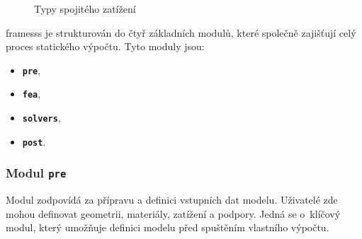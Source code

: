 \begin{figure}[H]
    
    \caption{Typy spojitého zatížení}
    \label{fig:distributed_load}
\end{figure}

framesss je strukturován do čtyř základních modulů, které společně zajišťují celý proces statického výpočtu. Tyto moduly jsou:
\begin{itemize}
    \item \textbf{\texttt{pre}},
    \item \textbf{\texttt{fea}},
    \item \textbf{\texttt{solvers}},
    \item \textbf{\texttt{post}}.
\end{itemize}


\subsubsection*{Modul \texttt{pre}}
Modul zodpovídá za přípravu a definici vstupních dat modelu. Uživatelé zde mohou definovat geometrii, materiály, zatížení a podpory. Jedná se o~klíčový modul, který umožňuje definici modelu před spuštěním vlastního výpočtu.

